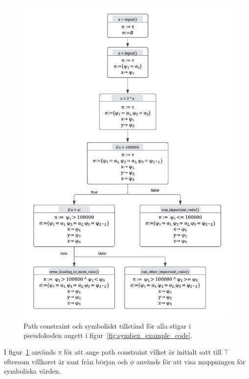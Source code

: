 \begin{figure}
    \centering
    \includegraphics[scale=0.5]{figures/final_symbolic_example_graph.png}
    \caption{Path constraint och symboliskt tillstånd för alla stigar i
        pseudokoden angett i figur~\ref{fig:symbex_example_code}.}
    \label{fig:symbex_example_graph}
\end{figure}

I figur~\ref{fig:symbex_example_graph} används $\pi$ för att ange path constraint vilket
är initialt satt till $\top$ eftersom villkoret är sant från början och $\phi$
används för att visa mappningen för symboliska värden.

